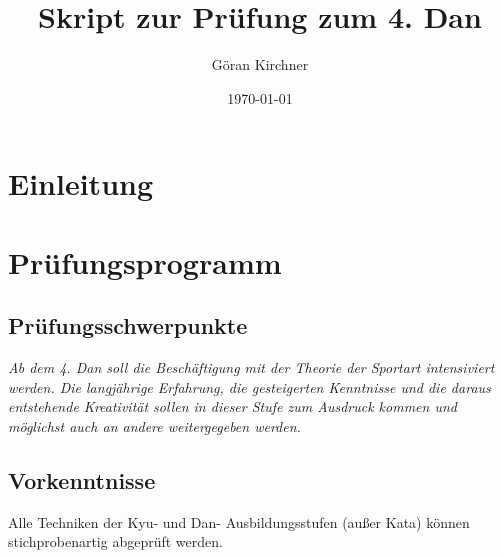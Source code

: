 \documentclass[justified, a4paper, notitlepage, captions=tableheading, nobib]{tufte-handout}
\author{Göran Kirchner}
\date{\today}
\title{Skript zur Prüfung zum 4. Dan}
\begin{document}
\maketitle
\tableofcontents

\ifxetex
  \newcommand{\textls}[2][5]{%
    \begingroup\addfontfeatures{LetterSpace=#1}#2\endgroup
  }
  \renewcommand{\allcapsspacing}[1]{\textls[15]{#1}}
  \renewcommand{\smallcapsspacing}[1]{\textls[10]{#1}}
  \renewcommand{\allcaps}[1]{\textls[15]{\MakeTextUppercase{#1}}}
  \renewcommand{\smallcaps}[1]{\smallcapsspacing{\scshape\MakeTextLowercase{#1}}}
  \renewcommand{\textsc}[1]{\smallcapsspacing{\textsmallcaps{#1}}}
\fi

\newpage
\section{Einleitung}
\label{sec:org32cdabb}

\newpage
\section{Prüfungsprogramm}
\label{sec:org0fe2920}
\subsection{Prüfungsschwerpunkte}
\label{sec:org2f699d5}
\emph{Ab dem 4. Dan soll die Beschäftigung mit der Theorie der Sportart intensiviert werden.
Die langjährige Erfahrung, die gesteigerten Kenntnisse und die daraus entstehende Kreativität sollen in dieser Stufe zum Ausdruck kommen und möglichst auch an andere weitergegeben werden.}

\subsection{Vorkenntnisse}
\label{sec:orgb38e75c}
Alle Techniken der Kyu- und Dan- Ausbildungsstufen (außer Kata) können stichprobenartig abgeprüft werden.
\end{document}
